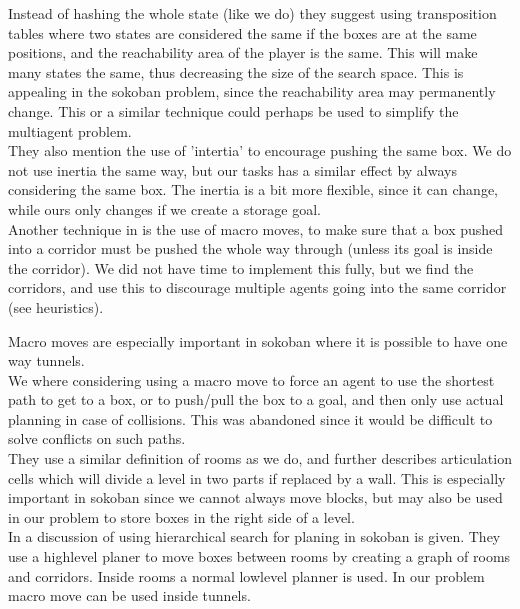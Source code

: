 \documentclass[letterpaper]{article}
\begin{document}
Instead of hashing the whole state (like we do) they suggest using transposition
tables where two states are considered the same if the boxes are at the same positions,
and the reachability area of the player is the same. This will make many states
the same, thus decreasing the size of the search space. This is appealing in
the sokoban problem, since the reachability area may permanently change. This
or a similar technique could perhaps be used to simplify the multiagent problem.\\

They also mention the use of 'intertia' to encourage pushing the same box.
We do not use inertia the same way, but our tasks has a similar effect by
always considering the same box. The inertia is a bit more flexible, since
it can change, while ours only changes if we create a storage goal.\\

Another technique in \cite{sokobanMA} is the use of macro moves, to make
sure that a box pushed into a corridor must be pushed the whole way through
(unless its goal is inside the corridor). We did not have time to implement
this fully, but we find the corridors, and use this to discourage multiple agents
going into the same corridor (see heuristics).

Macro moves are especially important in sokoban where it is possible to have
one way tunnels.\\

We where considering using a macro move to force an agent to use the shortest
path to get to a box, or to push/pull the box to a goal, and then only use actual
planning in case of collisions. This was abandoned since it would be difficult
to solve conflicts on such paths.\\

They use a similar definition of rooms as we do, and further describes articulation
cells which will divide a level in two parts if replaced by a wall. This is
especially important in sokoban since we cannot always move blocks, but may
also be used in our problem to store boxes in the right side of a level.\\

In \cite{highlevelSokoban} a discussion of using hierarchical search for
planing in sokoban is given. They use a highlevel planer to move boxes between
rooms by creating a graph of rooms and corridors. Inside rooms a normal lowlevel
planner is used. In our problem macro move can be used inside tunnels.
\end{document}
